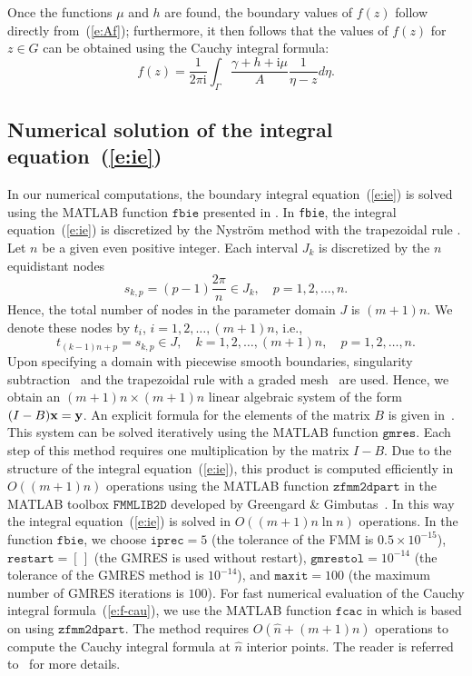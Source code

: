 \documentclass[11pt,a4paper]{article}
\renewcommand{\i}{\mathrm{i}}
\renewcommand{\i}{\mathrm{i}}
\newcommand{\bx}{{\bf x}}
\newcommand{\by}{{\bf y}}
\begin{document}
Once the functions $\mu$ and $h$ are found, the boundary values of $f(z)$ follow directly from~(\ref{e:Af}); furthermore, it then follows that the values of $f(z)$ for $z\in G$ can be obtained using the Cauchy integral formula:
\begin{equation}\label{e:f-cau}
f(z)=\frac{1}{2\pi\i}\int_{\Gamma} \frac{\gamma+h+\i\mu}{A} \frac{1}{\eta-z}d\eta.
\end{equation}

\subsection{Numerical solution of the integral equation~(\ref{e:ie})}
\label{sec:num}

In our numerical computations, the boundary integral equation~(\ref{e:ie}) is solved using the MATLAB function $\mathtt{fbie}$ presented in \cite{NAS-ETNA15}. In \verb|fbie|, the integral equation~(\ref{e:ie}) is discretized by the Nystr\"om method with the trapezoidal rule \cite{Atk97,Kre14}. 
Let $n$ be a given even positive integer. Each interval $J_k$ is discretized by the $n$ equidistant nodes
\[
s_{k,p}=(p-1)\frac{2\pi}{n}\in J_k, \quad p=1,2,\ldots,n.
\]
Hence, the total number of nodes in the parameter domain $J$ is $(m+1)n$.
We denote these nodes by $t_i$, $i=1,2,\ldots,(m+1)n$, i.e.,
\begin{equation}\label{e:ti-skp}
t_{(k-1)n+p}=s_{k,p}\in J, \quad k=1,2,\ldots,(m+1)n, \quad p=1,2,\ldots,n.
\end{equation}
Upon specifying a domain with piecewise smooth boundaries, singularity subtraction~\cite{rat} and the trapezoidal rule with a graded mesh~\cite{Kre90} are used.
Hence, we obtain an $(m+1)n \times (m+1)n$ linear algebraic system of the form $(I-B)\bx=\by$. An explicit formula for the elements of the matrix $B$ is given in~\cite{NAS-ETNA15}. This system can be solved iteratively using the MATLAB function $\mathtt{gmres}$. Each step of this method requires one multiplication by the matrix $I-B$. Due to the structure of the integral equation~(\ref{e:ie}), this product is computed efficiently in $O((m+1)n)$ operations using the MATLAB function $\mathtt{zfmm2dpart}$ in the MATLAB toolbox $\mathtt{FMMLIB2D}$ developed by Greengard \& Gimbutas~\cite{gre-gim}. In this way the integral equation~(\ref{e:ie}) is solved in $O((m+1)n\ln n)$ operations. 
In the function $\mathtt{fbie}$, we choose $\mathtt{iprec}=5$ (the tolerance of the FMM 
is $0.5\times 10^{-15}$), $\mathtt{restart}=[\,]$ (the GMRES is used without restart), $\mathtt{gmrestol}=10^{-14}$ (the tolerance of the GMRES method is $10^{-14}$), and $\mathtt{maxit}=100$ (the maximum number of GMRES iterations is $100$). 
For fast numerical evaluation of the Cauchy integral formula~(\ref{e:f-cau}), we use the MATLAB function $\mathtt{fcac}$ in \cite{NAS-ETNA15} which is based on using $\mathtt{zfmm2dpart}$. The method requires $O(\hat n+(m+1)n)$ operations to compute the Cauchy integral formula at $\hat n$ interior points.
The reader is referred to~\cite{NAS-ETNA15} for more details.  
\end{document}
